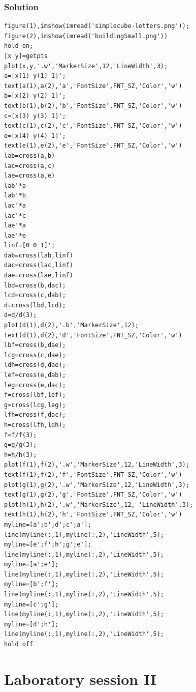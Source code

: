 \documentclass[12pt, a4paper]{report}
\begin{document}
    \subsection*{Solution}
        \begin{lstlisting}[style=Matlab]
figure(1),imshow(imread('simplecube-letters.png'));
figure(2),imshow(imread('buildingSmall.png'))
hold on;
[x y]=getpts
plot(x,y,'.w','MarkerSize',12,'LineWidth',3);
a=[x(1) y(1) 1]';
text(a(1),a(2),'a','FontSize',FNT_SZ,'Color','w')
b=[x(2) y(2) 1]';
text(b(1),b(2),'b','FontSize',FNT_SZ,'Color','w')
c=[x(3) y(3) 1]';
text(c(1),c(2),'c','FontSize',FNT_SZ,'Color','w')
e=[x(4) y(4) 1]';
text(e(1),e(2),'e','FontSize',FNT_SZ,'Color','w')
lab=cross(a,b)
lac=cross(a,c)
lae=cross(a,e)
lab'*a
lab'*b
lac'*a
lac'*c
lae'*a
lae'*e
linf=[0 0 1]';
dab=cross(lab,linf)
dac=cross(lac,linf)
dae=cross(lae,linf)
lbd=cross(b,dac);
lcd=cross(c,dab);
d=cross(lbd,lcd);
d=d/d(3);
plot(d(1),d(2),'.b','MarkerSize',12);
text(d(1),d(2),'d','FontSize',FNT_SZ,'Color','w')
lbf=cross(b,dae);
lcg=cross(c,dae);
ldh=cross(d,dae);
lef=cross(e,dab);
leg=cross(e,dac);
f=cross(lbf,lef);
g=cross(lcg,leg);
lfh=cross(f,dac);
h=cross(lfh,ldh);
f=f/f(3);
g=g/g(3);
h=h/h(3);
plot(f(1),f(2),'.w','MarkerSize',12,'LineWidth',3); 
text(f(1),f(2),'f','FontSize',FNT_SZ,'Color','w')
plot(g(1),g(2),'.w','MarkerSize',12,'LineWidth',3); 
text(g(1),g(2),'g','FontSize',FNT_SZ,'Color','w')
plot(h(1),h(2),'.w','MarkerSize',12, 'LineWidth',3);
text(h(1),h(2),'h','FontSize',FNT_SZ,'Color','w')
myline=[a';b';d';c';a'];
line(myline(:,1),myline(:,2),'LineWidth',5);
myline=[e';f';h';g';e'];
line(myline(:,1),myline(:,2),'LineWidth',5);
myline=[a';e'];
line(myline(:,1),myline(:,2),'LineWidth',5);
myline=[b';f'];
line(myline(:,1),myline(:,2),'LineWidth',5);
myline=[c';g'];
line(myline(:,1),myline(:,2),'LineWidth',5);
myline=[d';h'];
line(myline(:,1),myline(:,2),'LineWidth',5);
hold off
        \end{lstlisting}

\newpage

\chapter{Laboratory session II}
\end{document}
